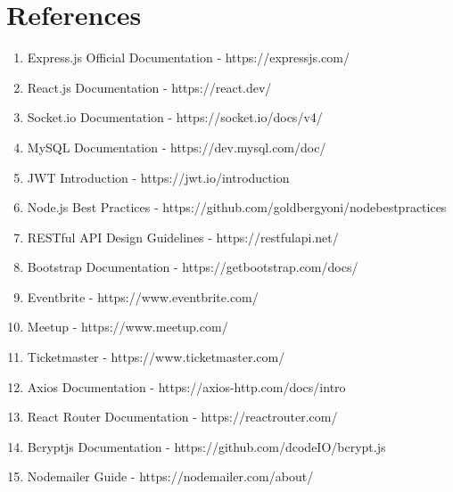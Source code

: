\documentclass[12pt]{report}
\begin{document}
 
\renewcommand\bibname{References}

\section*{References}

\begin{enumerate}

\item Express.js Official Documentation - https://expressjs.com/

\item React.js Documentation - https://react.dev/

\item Socket.io Documentation - https://socket.io/docs/v4/

\item MySQL Documentation - https://dev.mysql.com/doc/

\item JWT Introduction - https://jwt.io/introduction

\item Node.js Best Practices - https://github.com/goldbergyoni/nodebestpractices

\item RESTful API Design Guidelines - https://restfulapi.net/

\item Bootstrap Documentation - https://getbootstrap.com/docs/

\item Eventbrite - https://www.eventbrite.com/

\item Meetup - https://www.meetup.com/

\item Ticketmaster - https://www.ticketmaster.com/

\item Axios Documentation - https://axios-http.com/docs/intro

\item React Router Documentation - https://reactrouter.com/

\item Bcryptjs Documentation - https://github.com/dcodeIO/bcrypt.js

\item Nodemailer Guide - https://nodemailer.com/about/

\end{enumerate}
\end{document}
